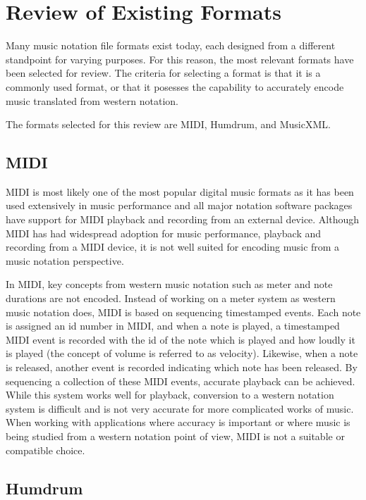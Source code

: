 
\section{Review of Existing Formats}

Many music notation file formats exist today, each designed from a different standpoint for varying purposes. For this reason, the most relevant formats have been selected for review. The criteria for selecting a format is that it is a commonly used format, or that it posesses the capability to accurately encode music translated from western notation.

The formats selected for this review are MIDI, Humdrum, and MusicXML.

\subsection{MIDI}

MIDI \citep*{HeSe97} is most likely one of the most popular digital music formats as it has been used extensively in music performance and all major notation software packages have support for MIDI playback and recording from an external device. Although MIDI has had widespread adoption for music performance, playback and recording from a MIDI device, it is not well suited for encoding music from a music notation perspective.

In MIDI, key concepts from western music notation such as meter and note durations are not encoded. Instead of working on a meter system as western music notation does, MIDI is based on sequencing timestamped events. Each note is assigned an id number in MIDI, and when a note is played, a timestamped MIDI event is recorded with the id of the note which is played and how loudly it is played (the concept of volume is referred to as velocity). Likewise, when a note is released, another event is recorded indicating which note has been released. By sequencing a collection of these MIDI events, accurate playback can be achieved. While this system works well for playback, conversion to a western notation system is difficult and is not very accurate for more complicated works of music. When working with applications where accuracy is important or where music is being studied from a western notation point of view, MIDI is not a suitable or compatible choice.

\subsection{Humdrum}

